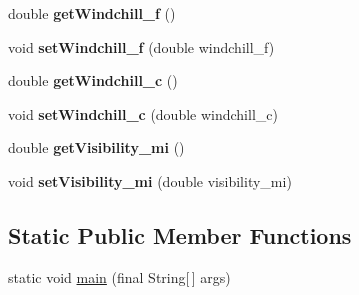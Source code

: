 \begin{DoxyCompactItemize}
\item 
\hypertarget{classgov_1_1fnal_1_1ppd_1_1dd_1_1xml_1_1news_1_1current__observation_a0c80772bef406cf38ec42d671c0e602b}{double {\bfseries get\-Windchill\-\_\-f} ()}\label{classgov_1_1fnal_1_1ppd_1_1dd_1_1xml_1_1news_1_1current__observation_a0c80772bef406cf38ec42d671c0e602b}

\item 
\hypertarget{classgov_1_1fnal_1_1ppd_1_1dd_1_1xml_1_1news_1_1current__observation_a4fdee07608f08a5129c42493733165ed}{void {\bfseries set\-Windchill\-\_\-f} (double windchill\-\_\-f)}\label{classgov_1_1fnal_1_1ppd_1_1dd_1_1xml_1_1news_1_1current__observation_a4fdee07608f08a5129c42493733165ed}

\item 
\hypertarget{classgov_1_1fnal_1_1ppd_1_1dd_1_1xml_1_1news_1_1current__observation_ab0fee3db8ee6038f8f8c484c10bdefc7}{double {\bfseries get\-Windchill\-\_\-c} ()}\label{classgov_1_1fnal_1_1ppd_1_1dd_1_1xml_1_1news_1_1current__observation_ab0fee3db8ee6038f8f8c484c10bdefc7}

\item 
\hypertarget{classgov_1_1fnal_1_1ppd_1_1dd_1_1xml_1_1news_1_1current__observation_a594551d4a2e2116d6dbd8743a5a476c6}{void {\bfseries set\-Windchill\-\_\-c} (double windchill\-\_\-c)}\label{classgov_1_1fnal_1_1ppd_1_1dd_1_1xml_1_1news_1_1current__observation_a594551d4a2e2116d6dbd8743a5a476c6}

\item 
\hypertarget{classgov_1_1fnal_1_1ppd_1_1dd_1_1xml_1_1news_1_1current__observation_a54825110265e610c987ec246e77f72fa}{double {\bfseries get\-Visibility\-\_\-mi} ()}\label{classgov_1_1fnal_1_1ppd_1_1dd_1_1xml_1_1news_1_1current__observation_a54825110265e610c987ec246e77f72fa}

\item 
\hypertarget{classgov_1_1fnal_1_1ppd_1_1dd_1_1xml_1_1news_1_1current__observation_a9b3bd81568b80dcf542be79839161b2d}{void {\bfseries set\-Visibility\-\_\-mi} (double visibility\-\_\-mi)}\label{classgov_1_1fnal_1_1ppd_1_1dd_1_1xml_1_1news_1_1current__observation_a9b3bd81568b80dcf542be79839161b2d}

\end{DoxyCompactItemize}
\subsection*{Static Public Member Functions}
\begin{DoxyCompactItemize}
\item 
static void \hyperlink{classgov_1_1fnal_1_1ppd_1_1dd_1_1xml_1_1news_1_1current__observation_a5d091b24033393302afa9f1f5cef1435}{main} (final String\mbox{[}$\,$\mbox{]} args)
\end{DoxyCompactItemize}


